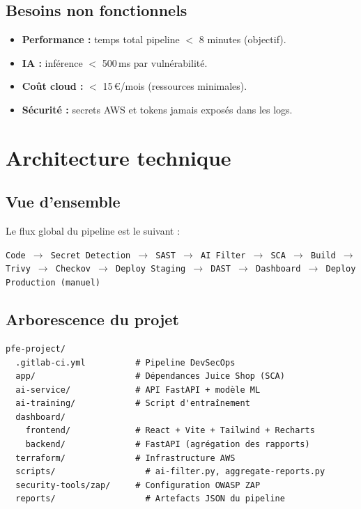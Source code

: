 \documentclass[12pt,a4paper]{report}
\begin{document}
\section{Besoins non fonctionnels}
\begin{itemize}
    \item \textbf{Performance :} temps total pipeline $<$ 8 minutes (objectif).
    \item \textbf{IA :} inférence $<$ 500\,ms par vulnérabilité.
    \item \textbf{Coût cloud :} $<$ 15\,€/mois (ressources minimales).
    \item \textbf{Sécurité :} secrets AWS et tokens jamais exposés dans les logs.
\end{itemize}

\chapter{Architecture technique}
\label{ch:archi}

\section{Vue d'ensemble}
Le flux global du pipeline est le suivant :
\begin{center}
\texttt{Code $\rightarrow$ Secret Detection $\rightarrow$ SAST $\rightarrow$ AI Filter $\rightarrow$ SCA $\rightarrow$ Build $\rightarrow$ Trivy $\rightarrow$ Checkov $\rightarrow$ Deploy Staging $\rightarrow$ DAST $\rightarrow$ Dashboard $\rightarrow$ Deploy Production (manuel)}
\end{center}

\section{Arborescence du projet}
\begin{lstlisting}
pfe-project/
  .gitlab-ci.yml          # Pipeline DevSecOps
  app/                    # Dépendances Juice Shop (SCA)
  ai-service/             # API FastAPI + modèle ML
  ai-training/            # Script d'entraînement
  dashboard/
    frontend/             # React + Vite + Tailwind + Recharts
    backend/              # FastAPI (agrégation des rapports)
  terraform/              # Infrastructure AWS
  scripts/                  # ai-filter.py, aggregate-reports.py
  security-tools/zap/     # Configuration OWASP ZAP
  reports/                  # Artefacts JSON du pipeline
\end{lstlisting}
\end{document}
